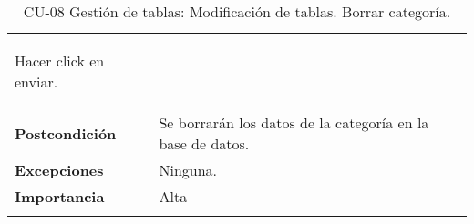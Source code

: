 \begin{longtable}[H]{@{}ll@{}}
\begin{minipage}[t]{0.71\columnwidth}
\begin{enumerate}
Hacer click en enviar.
\end{enumerate}\strut
\end{minipage}\tabularnewline
\begin{minipage}[t]{0.23\columnwidth}\raggedright\strut
\textbf{Postcondición}\strut
\end{minipage} & \begin{minipage}[t]{0.71\columnwidth}\raggedright\strut
Se borrarán los datos de la categoría en la base de datos.\strut
\end{minipage}\tabularnewline
\begin{minipage}[t]{0.23\columnwidth}\raggedright\strut
\textbf{Excepciones}\strut
\end{minipage} & \begin{minipage}[t]{0.71\columnwidth}\raggedright\strut
Ninguna. \strut
\end{minipage}\tabularnewline
\begin{minipage}[t]{0.23\columnwidth}\raggedright\strut
\textbf{Importancia}\strut
\end{minipage} & \begin{minipage}[t]{0.71\columnwidth}\raggedright\strut
Alta\strut
\end{minipage}\tabularnewline
\bottomrule
\caption{CU-08 Gestión de tablas: Modificación de tablas. Borrar categoría.}
\end{longtable}

